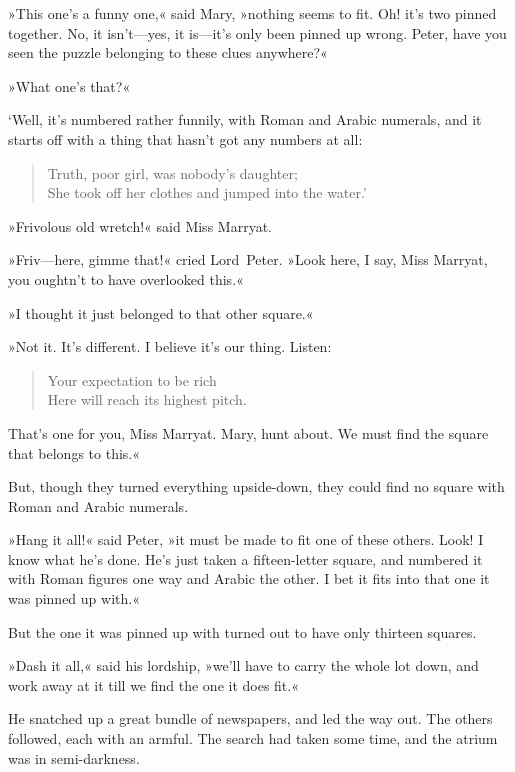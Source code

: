 »This one's a funny one,« said Mary, »nothing seems to fit. Oh! it's two pinned together. No, it isn't—yes, it is—it's only been pinned up wrong. Peter, have you seen the puzzle belonging to these clues anywhere?«

»What one's that?«

`Well, it's numbered rather funnily, with Roman and Arabic numerals, and it starts off with a thing that hasn't got any numbers at all:

\begin{verse}
Truth, poor girl, was nobody's daughter;\\
She took off her clothes and jumped into the water.'
\end{verse}

»Frivolous old wretch!« said Miss Marryat.

»Friv—here, gimme that!« cried Lord~Peter. »Look here, I say, Miss Marryat, you oughtn't to have overlooked this.«

»I thought it just belonged to that other square.«

»Not it. It's different. I believe it's our thing. Listen:

\begin{verse}
Your expectation to be rich\\
Here will reach its highest pitch.\\
\end{verse}

That's one for you, Miss Marryat. Mary, hunt about. We must find the square that belongs to this.«

But, though they turned everything upside-down, they could find no square with Roman and Arabic numerals.

»Hang it all!« said Peter, »it must be made to fit one of these others. Look! I know what he's done. He's just taken a fifteen-letter square, and numbered it with Roman figures one way and Arabic the other. I bet it fits into that one it was pinned up with.«

But the one it was pinned up with turned out to have only thirteen squares.

»Dash it all,« said his lordship, »we'll have to carry the whole lot down, and work away at it till we find the one it does fit.«

He snatched up a great bundle of newspapers, and led the way out. The others followed, each with an armful. The search had taken some time, and the atrium was in semi-darkness.

